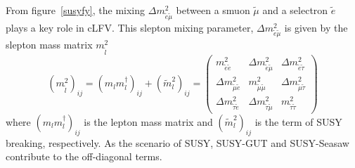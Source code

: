 From figure~\ref{susyfy}, the mixing $\Delta m_{\tilde{e}\tilde{\mu}}^2$ between a smuon $\tilde{\mu}$ and a selectron $\tilde{e}$ plays a key role in cLFV.
This slepton mixing parameter, $\Delta m_{\tilde{e}\tilde{\mu}}^2$ is given by the slepton mass matrix $m_{\tilde{l}}^2$
\begin{equation}
 (m_{\tilde{l}}^2)_{ij} = (m_lm_l^{\dagger})_{ij} + (\tilde{m}_l^2)_{ij} = 
 \begin{pmatrix}
  m_{\tilde{e}\tilde{e}}^2 & \Delta m_{\tilde{e}\tilde{\mu}}^2 & \Delta m_{\tilde{e}\tilde{\tau}}^2 \\
  \Delta m_{\tilde{\mu}\tilde{e}}^2 & m_{\tilde{\mu}\tilde{\mu}}^2 & \Delta m_{\tilde{\mu}\tilde{\tau}}^2 \\
  \Delta m_{\tilde{\tau}\tilde{e}}^2 & \Delta m_{\tilde{\tau}\tilde{\mu}}^2 & m_{\tilde{\tau}\tilde{\tau}}^2
 \end{pmatrix}
\end{equation}
where $(m_lm_l^{\dagger})_{ij}$ is the lepton mass matrix and $(\tilde{m}_l^2)_{ij}$ is the term of SUSY breaking, respectively.
As the scenario of SUSY, SUSY-GUT and SUSY-Seasaw contribute to the off-diagonal terms.

